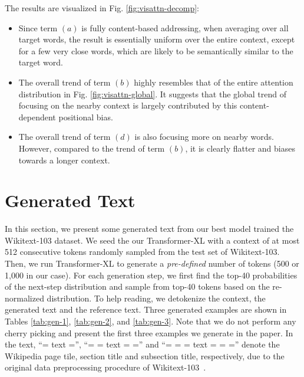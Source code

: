 The results are visualized in Fig. \ref{fig:visattn-decomp}:
\begin{itemize}[leftmargin=*]
	\item Since term $(a)$ is fully content-based addressing, when averaging over all target words, the result is essentially uniform over the entire context, except for a few very close words, which are likely to be semantically similar to the target word.
	\item The overall trend of term $(b)$ highly resembles that of the entire attention distribution in Fig. \ref{fig:visattn-global}. It suggests that the global trend of focusing on the nearby context is largely contributed by this content-dependent positional bias.
	\item The overall trend of term $(d)$ is also focusing more on nearby words. However, compared to the trend of term $(b)$, it is clearly flatter and biases towards a longer context.
\end{itemize}

\section{Generated Text} \label{sec:gen}
In this section, we present some generated text from our best model trained the Wikitext-103 dataset.
We seed the our Transformer-XL with a context of at most 512 consecutive tokens randomly sampled from the test set of Wikitext-103. Then, we run Transformer-XL to generate a \textit{pre-defined} number of tokens (500 or 1,000 in our case). For each generation step, we first find the top-40 probabilities of the next-step distribution and sample from top-40 tokens based on the re-normalized distribution.
To help reading, we detokenize the context, the generated text and the reference text. Three generated examples are shown in Tables \ref{tab:gen-1}, \ref{tab:gen-2}, and \ref{tab:gen-3}. Note that we do not perform any cherry picking and present the first three examples we generate in the paper.
In the text, ``= text ='', ``= = text = ='' and ``= = = text = = ='' denote the Wikipedia page tile, section title and subsection title, respectively, due to the original data preprocessing procedure of Wikitext-103~\cite{merity2016pointer}. 

